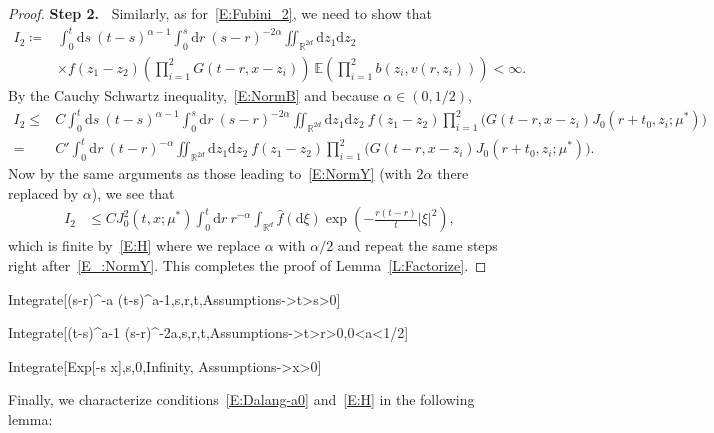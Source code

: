 \documentclass[a4paper,11pt]{article}%
\theoremstyle{plain}
\theoremstyle{definition}
\numberwithin{equation}{section}
\newcommand{\R}{\mathbb{R}}
\newcommand{\E}{\mathbb{E}}
\newcommand{\ud}{\ensuremath{\mathrm{d}}}
\begin{document}
\begin{proof}
  \textbf{\noindent Step 2.~} Similarly, as for~\eqref{E:Fubini_2}, we need to show that
  \begin{align*}
    I_2\coloneqq & \int_0^t \ud s \: (t-s)^{\alpha-1} \int_0^s \ud r\: (s-r)^{-2\alpha} \iint_{\R^{2d}} \ud z_1\ud z_2\: \\
                 & \times f(z_1-z_2) \left(\prod_{i = 1}^{2} G(t-r,x-z_i)\right) \: \E\left(\prod_{i = 1}^{2}b(z_i,v(r,z_i))\right) < \infty.
  \end{align*}
  By the Cauchy Schwartz inequality,~\eqref{E:NormB} and because $\alpha\in (0,1/2)$,
  \begin{align*}
    I_2\le & C \int_0^t \ud s \: (t-s)^{\alpha-1} \int_0^s \ud r\: (s-r)^{-2\alpha} \iint_{\R^{2d}} \ud z_1\ud z_2\:f(z_1-z_2) \prod_{i = 1}^{2}\bigg(G(t-r,x-z_i) J_0\left(r + t_0,z_i;\mu^*\right)\bigg) \\
         = & C' \int_0^t \ud r \: (t-r)^{-\alpha} \iint_{\R^{2d}} \ud z_1\ud z_2\:f(z_1-z_2) \prod_{i = 1}^{2}\bigg(G(t-r,x-z_i) J_0\left(r + t_0, z_i;\mu^*\right)\bigg).
  \end{align*}
  Now by the same arguments as those leading to~\eqref{E:NormY} (with $2\alpha$ there replaced by
  $\alpha$), we see that
  \begin{align*}
    I_2 & \le C J_0^2\left(t,x; \mu^*\right) \int_0^t \ud r \: r^{-\alpha} \int_{\R^d} \widehat{f}(\ud \xi)\exp\left(-\frac{r(t-r)}{t}|\xi|^2\right),
  \end{align*}
  which is finite by~\eqref{E:H} where we replace $\alpha$ with $\alpha/2$ and repeat the same steps
  right after~\eqref{E_:NormY}. This completes the proof of Lemma~\ref{L:Factorize}.
\end{proof}

\begin{codes}%

Integrate[(s-r)^{-a} (t-s)^{a-1},{s,r,t},Assumptions->{t>s>0}]

Integrate[(t-s)^{a-1} (s-r)^{-2a},{s,r,t},Assumptions->{t>r>0,0<a<1/2}]

\end{codes}

\begin{codes}%

  Integrate[Exp[-s x],{s,0,Infinity}, Assumptions->x>0]

\end{codes}

Finally, we characterize conditions~\eqref{E:Dalang-a0} and~\eqref{E:H} in the following lemma:
\end{document}
